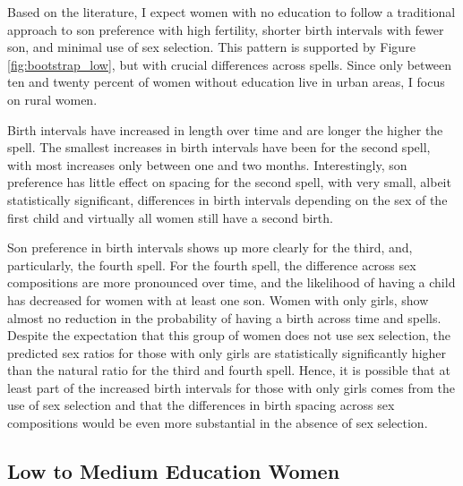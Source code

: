 \documentclass[12pt,letterpaper]{article}
\begin{document}
Based on the literature, I expect women with no education to follow a traditional approach
to son preference with high fertility, shorter birth intervals with fewer son, and  
minimal use of sex selection.
This pattern is supported by Figure \ref{fig:bootstrap_low}, but with crucial differences 
across spells.
Since only between ten and twenty percent of women without education live in urban areas, 
I focus on rural women.

Birth intervals have increased in length over time and are longer the higher the spell.
The smallest increases in birth intervals have been for the second spell, with most 
increases only between one and two months.
Interestingly, son preference has little effect on spacing for the second spell, with 
very small, albeit statistically significant, differences in birth intervals depending on 
the sex of the first child and virtually all women still have a second birth.

Son preference in birth intervals shows up more clearly for the third, and, particularly, 
the fourth spell.
For the fourth spell, the difference across sex compositions are more pronounced over time, 
and the likelihood of having a child has decreased for women with at least one son.
Women with only girls, show almost no reduction in the probability of having a birth 
across time and spells.
Despite the expectation that this group of women does not use sex selection, the predicted 
sex ratios for those with only girls are statistically significantly higher than the 
natural ratio for the third and fourth spell.
Hence, it is possible that at least part of the increased  birth intervals for those
with only girls comes from the use of sex selection and that the differences in birth 
spacing across sex compositions would be even more substantial in the absence of sex 
selection.


\subsection{Low to Medium Education Women}


\end{document}
